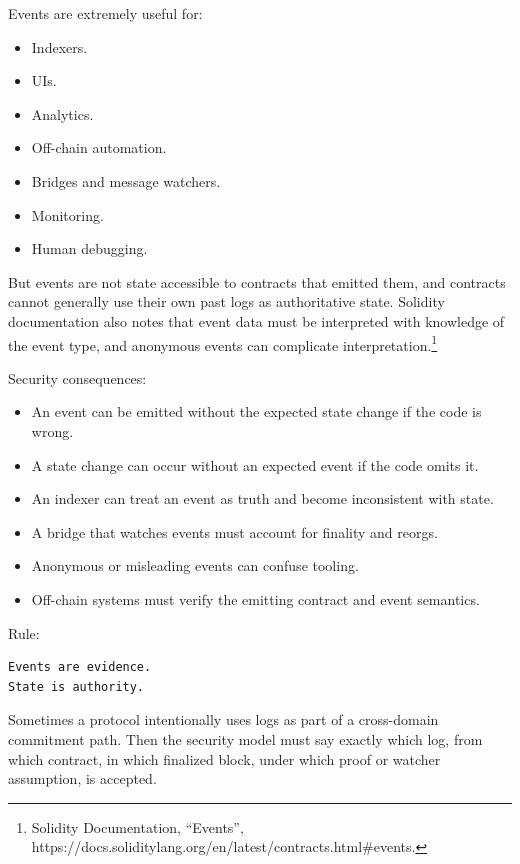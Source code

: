 Events are extremely useful for:

\begin{itemize}
\tightlist
\item
  Indexers.
\item
  UIs.
\item
  Analytics.
\item
  Off-chain automation.
\item
  Bridges and message watchers.
\item
  Monitoring.
\item
  Human debugging.
\end{itemize}

But events are not state accessible to contracts that emitted them, and
contracts cannot generally use their own past logs as authoritative
state. Solidity documentation also notes that event data must be
interpreted with knowledge of the event type, and anonymous events can
complicate interpretation.\footnote{Solidity Documentation, ``Events'',
  https://docs.soliditylang.org/en/latest/contracts.html\#events.}

Security consequences:

\begin{itemize}
\tightlist
\item
  An event can be emitted without the expected state change if the code
  is wrong.
\item
  A state change can occur without an expected event if the code omits
  it.
\item
  An indexer can treat an event as truth and become inconsistent with
  state.
\item
  A bridge that watches events must account for finality and reorgs.
\item
  Anonymous or misleading events can confuse tooling.
\item
  Off-chain systems must verify the emitting contract and event
  semantics.
\end{itemize}

Rule:

\begin{lstlisting}
Events are evidence.
State is authority.
\end{lstlisting}

Sometimes a protocol intentionally uses logs as part of a cross-domain
commitment path. Then the security model must say exactly which log,
from which contract, in which finalized block, under which proof or
watcher assumption, is accepted.

